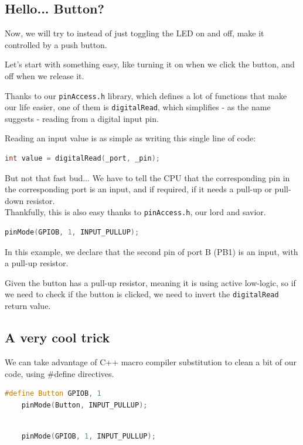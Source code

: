 \documentclass{article}
\begin{document}
\subsection{Hello... Button?}

Now, we will try to instead of just toggling the LED on and off, make it controlled by a push button.

Let's start with something easy, like turning it on when we click the button, and off when we release it.

Thanks to our \verb|pinAccess.h| library, which defines a lot of functions that make our life easier, one of them is \verb|digitalRead|, which simplifies - as the name suggests - reading from a digital input pin.

Reading an input value is as simple as writing this single line of code:

\begin{lstlisting}[language=C++]
    int value = digitalRead(_port, _pin);
\end{lstlisting}

But not that fast bud... We have to tell the CPU that the corresponding pin in the corresponding port is an input, and if required, if it needs a pull-up or pull-down resistor. \\
Thankfully, this is also easy thanks to \verb|pinAccess.h|, our lord and savior.

\begin{lstlisting}[language=C++]
    pinMode(GPIOB, 1, INPUT_PULLUP);
\end{lstlisting}

In this example, we declare that the second pin of port B (PB1) is an input, with a pull-up resistor.

Given the button has a pull-up resistor, meaning it is using active low-logic, so if we need to check if the button is clicked, we need to invert the \verb|digitalRead| return value.

\subsection{A very cool trick}

We can take advantage of C++ macro compiler substitution to clean a bit of our code, using \#define directives.

\begin{multicols}{2}
\begin{lstlisting}[language=C++]
    #define Button GPIOB, 1
    pinMode(Button, INPUT_PULLUP);
\end{lstlisting}

\begin{lstlisting}[language=C++]
    
    pinMode(GPIOB, 1, INPUT_PULLUP);
\end{lstlisting}
\end{multicols}
\end{document}
